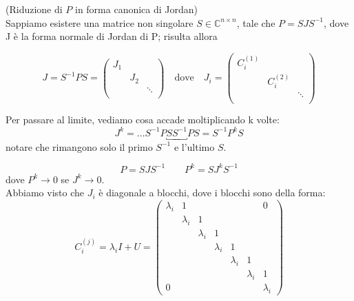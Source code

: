 \begin{thproof}
(Riduzione di $P$ in forma canonica di Jordan)\\

Sappiamo esistere una matrice non singolare $S \in \mathbb{C}^{n
  \times n}$, tale che $P = SJS^{-1}$, dove J \`e la forma normale di
Jordan di P; risulta allora

$$ J = S^{-1} P S = 
\begin{pmatrix}
J_1       &           &        \\
          & J_2       &        \\
          &           & \ddots \\
\end{pmatrix}
\quad \text{dove} \quad 
J_i =
\begin{pmatrix}
C^{(1)}_i &           &        \\
          & C^{(2)}_i &        \\
          &           & \ddots \\
\end{pmatrix} $$

Per passare al limite, vediamo cosa accade moltiplicando k volte:
$$ J^k = \ldots S^{-1}P \underbracket{S S^{-1}}PS = S^{-1}P^{k} S $$
notare che rimangono solo il primo $S^{-1}$ e l'ultimo $S$.

$$ P = SJS^{-1} \qquad P^k = SJ^kS^{-1}$$ 
dove $P^k \rightarrow 0$ se $J^k \rightarrow 0$.\\


Abbiamo visto che $J_i$ \`e diagonale a blocchi, dove i blocchi sono della forma:
$$ C_{i}^{(j)} = \lambda_i I + U =
\begin{pmatrix}
\lambda_{i} & 1           &             &             &             &             & 0 \\
            & \lambda_{i} & 1           &             &             &             &   \\
            &             & \lambda_{i} & 1           &             &             &   \\
            &             &             & \lambda_{i} & 1           &             &   \\
            &             &             &             & \lambda_{i} & 1           &   \\
            &             &             &             &             & \lambda_{i} & 1 \\
0           &             &             &             &             &             & \lambda_{i}
\end{pmatrix}
 $$


\end{thproof}
